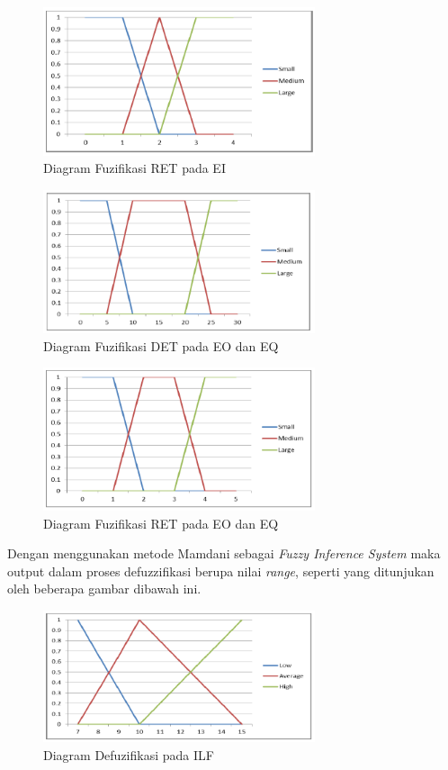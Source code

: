 \documentclass[a4paper]{article}
\begin{document}
\begin{multicols}{2}
\begin{figure}[H]
    \centering
    \includegraphics[width=8cm]{gambar5diagramfuzifikasiret.png}
    \caption{Diagram Fuzifikasi RET pada EI}
    \label{gb5}
\end{figure}

\begin{figure}[H]
    \centering
    \includegraphics[width=8cm]{gambar6diagramfuzifikasidet.png}
    \caption{Diagram Fuzifikasi DET pada EO dan EQ}
    \label{gb6}
\end{figure}

\begin{figure}[H]
    \centering
    \includegraphics[width=8cm]{gambar7diagramfuzifikasiret.png}
    \caption{Diagram Fuzifikasi RET pada EO dan EQ}
    \label{gb7}
\end{figure}

\par Dengan menggunakan metode Mamdani sebagai \textit{Fuzzy Inference System} maka output dalam proses defuzzifikasi berupa nilai \textit{range}, seperti yang ditunjukan oleh beberapa gambar dibawah ini.

\begin{figure}[H]
    \centering
    \includegraphics[width=8cm]{gambar8diagramdefuzifikasi.png}
    \caption{Diagram Defuzifikasi pada ILF}
    \label{gb8}
\end{figure}


\end{multicols}
\end{document}
